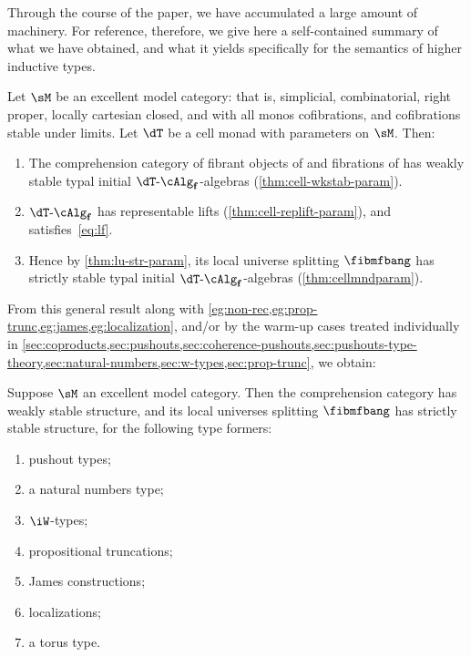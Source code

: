 \documentclass{amsart}
\let\W\iW
\def\alg{\text{-}\cAlg}
\def\algf{\alg_{\mathbf{f}}}
\begin{document}
Through the course of the paper, we have accumulated a large amount of machinery.
%
For reference, therefore, we give here a self-contained summary of what we have obtained, and what it yields specifically for the semantics of higher inductive types.

\begin{theorem}
  Let $\sM$ be an excellent model category: that is, simplicial, combinatorial, right proper, locally cartesian closed, and with all monos cofibrations, and cofibrations stable under limits.
  Let $\dT$ be a cell monad with parameters on $\sM$.
  Then:
  \begin{enumerate}
  \item The comprehension category \fibmf of fibrant objects of \sM and fibrations of \sM has weakly stable typal initial $\dT\algf$-algebras (\cref{thm:cell-wkstab-param}).
  \item $\dT\algf$ has representable lifts (\cref{thm:cell-replift-param}), and \Mf satisfies~\eqref{eq:lf}.
  \item Hence by \cref{thm:lu-str-param}, its local universe splitting $\fibmfbang$ has strictly stable typal initial $\dT\algf$-algebras (\cref{thm:cellmndparam}).
  \end{enumerate}
\end{theorem}

From this general result along with \cref{eg:non-rec,eg:prop-trunc,eg:james,eg:localization}, and/or by the warm-up cases treated individually in \cref{sec:coproducts,sec:pushouts,sec:coherence-pushouts,sec:pushouts-type-theory,sec:natural-numbers,sec:w-types,sec:prop-trunc}, we obtain:
% 
\begin{theorem}
  Suppose $\sM$ an excellent model category.  
  Then the comprehension category \fibmf has weakly stable structure, and its local universes splitting $\fibmfbang$ has strictly stable structure, for the following type formers:
  \begin{enumerate}
  \item pushout types;
  \item a natural numbers type;
  \item $\W$-types;
  \item propositional truncations;
  \item James constructions;
  \item localizations;
  \item a torus type.
  \end{enumerate}
\end{theorem}
\end{document}

